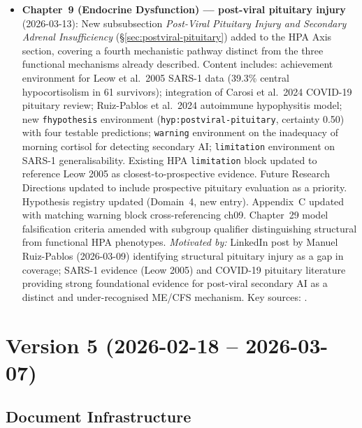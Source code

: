 \begin{itemize}
  \item \textbf{Chapter~9 (Endocrine Dysfunction) --- post-viral pituitary injury} (2026-03-13):
    New subsubsection \textit{Post-Viral Pituitary Injury and Secondary Adrenal Insufficiency}
    (\S\ref{sec:postviral-pituitary}) added to the HPA Axis section, covering a fourth
    mechanistic pathway distinct from the three functional mechanisms already described.
    Content includes: achievement environment for Leow et al.\ 2005 SARS-1 data (39.3\%
    central hypocortisolism in 61 survivors); integration of Carosi et al.\ 2024 COVID-19
    pituitary review; Ruiz-Pablos et al.\ 2024 autoimmune hypophysitis model; new
    \texttt{fhypothesis} environment (\texttt{hyp:postviral-pituitary}, certainty 0.50) with
    four testable predictions; \texttt{warning} environment on the inadequacy of morning
    cortisol for detecting secondary AI; \texttt{limitation} environment on SARS-1
    generalisability. Existing HPA \texttt{limitation} block updated to reference Leow 2005 as
    closest-to-prospective evidence. Future Research Directions updated to include prospective
    pituitary evaluation as a priority. Hypothesis registry updated (Domain~4, new entry).
    Appendix~C updated with matching warning block cross-referencing ch09. Chapter~29 model
    falsification criteria amended with subgroup qualifier distinguishing structural from
    functional HPA phenotypes.
    \textit{Motivated by:} LinkedIn post by Manuel Ruiz-Pablos (2026-03-09) identifying
    structural pituitary injury as a gap in coverage; SARS-1 evidence (Leow 2005) and
    COVID-19 pituitary literature providing strong foundational evidence for post-viral
    secondary AI as a distinct and under-recognised ME/CFS mechanism.
    Key sources: \cite{Leow2005sars,Ruiz2024hpa,Carosi2024hypopituitarism}.

\end{itemize}

\section*{Version 5 (2026-02-18 -- 2026-03-07)}

\subsection*{Document Infrastructure}

